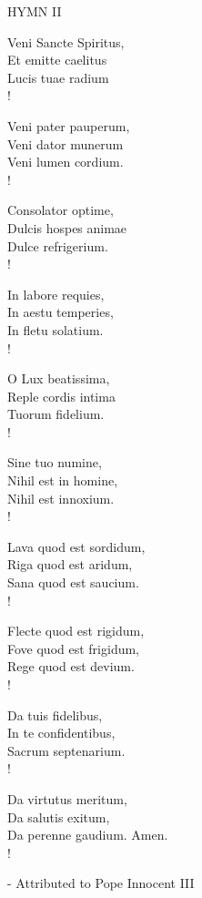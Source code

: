 \noindent\small{\uppercase{Hymn II}}\normalsize\label{pentecost:lastHymn}
\begin{cverse}
Veni Sancte Spiritus,\\
Et emitte caelitus\\
Lucis tuae radium\\!

Veni pater pauperum,\\
Veni dator munerum\\
Veni lumen cordium.\\!

Consolator optime,\\
Dulcis hospes animae\\
Dulce refrigerium.\\!

In labore requies,\\
In aestu temperies,\\
In fletu solatium.\\!

O Lux beatissima,\\
Reple cordis intima\\
Tuorum fidelium.\\!

Sine tuo numine,\\
Nihil est in homine,\\
Nihil est innoxium.\\!

Lava quod est sordidum,\\
Riga quod est aridum,\\
Sana quod est saucium.\\!

Flecte quod est rigidum,\\
Fove quod est frigidum,\\
Rege quod est devium.\\!

Da tuis fidelibus,\\
In te confidentibus,\\
Sacrum septenarium.\\!

Da virtutus meritum,\\
Da salutis exitum,\\
Da perenne gaudium. Amen.\\!
\end{cverse}
\begin{flushright}\tiny - Attributed to Pope Innocent III\end{flushright}

